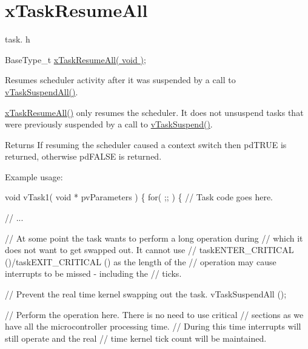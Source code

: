 \hypertarget{group__x_task_resume_all}{}\section{x\+Task\+Resume\+All}
\label{group__x_task_resume_all}
task. h 
\begin{DoxyPre}BaseType\_t \hyperlink{task_8h_a003f8ae6d649225abd030cc76e1c7d0e}{xTaskResumeAll( void )};\end{DoxyPre}


Resumes scheduler activity after it was suspended by a call to \hyperlink{task_8h_a366b302eba79d10b5ee2a3756f0fcc43}{v\+Task\+Suspend\+All()}.

\hyperlink{task_8h_a003f8ae6d649225abd030cc76e1c7d0e}{x\+Task\+Resume\+All()} only resumes the scheduler. It does not unsuspend tasks that were previously suspended by a call to \hyperlink{task_8h_a84d4e660b04630be2939d91b3c2412f8}{v\+Task\+Suspend()}.

\begin{DoxyReturn}{Returns}
If resuming the scheduler caused a context switch then pd\+T\+R\+UE is returned, otherwise pd\+F\+A\+L\+SE is returned.
\end{DoxyReturn}
Example usage\+: 
\begin{DoxyPre}
void vTask1( void * pvParameters )
\{
    for( ;; )
    \{
     // Task code goes here.\end{DoxyPre}



\begin{DoxyPre}     // ...\end{DoxyPre}



\begin{DoxyPre}     // At some point the task wants to perform a long operation during
     // which it does not want to get swapped out.  It cannot use
     // taskENTER\_CRITICAL ()/taskEXIT\_CRITICAL () as the length of the
     // operation may cause interrupts to be missed - including the
     // ticks.\end{DoxyPre}



\begin{DoxyPre}     // Prevent the real time kernel swapping out the task.
     vTaskSuspendAll ();\end{DoxyPre}



\begin{DoxyPre}     // Perform the operation here.  There is no need to use critical
     // sections as we have all the microcontroller processing time.
     // During this time interrupts will still operate and the real
     // time kernel tick count will be maintained.\end{DoxyPre}



